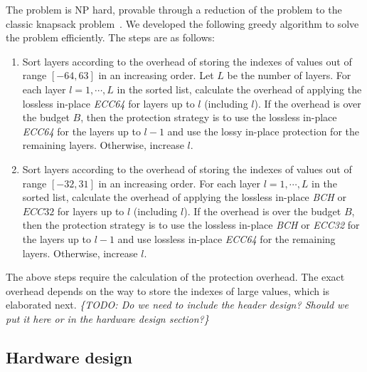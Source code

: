 \documentclass{article}
\newcommand{\TODO}[1]{{\it \color{blue}\{TODO: #1\}}}
\begin{document}
The problem is NP hard, provable through a reduction of the problem to the classic knapsack problem~\cite{hochba1997approximation}. We developed the following greedy algorithm to solve the problem efficiently. The steps are as follows:  
\begin{enumerate}
    \item Sort layers according to the overhead of storing the indexes of values out of range $[-64, 63]$ in an increasing order. Let $L$ be the number of layers. For each layer $l =1, \cdots, L$ in the sorted list, calculate the overhead of applying the lossless in-place \textit{ECC64} for layers up to $l$ (including $l$). If the overhead is over the budget $B$, then the protection strategy is to use the lossless in-place \textit{ECC64} for the layers up to $l-1$ and use the lossy in-place protection for the remaining layers. Otherwise, increase $l$. 
    \item Sort layers according to the overhead of storing the indexes of values out of range $[-32, 31]$ in an increasing order. For each layer $l =1, \cdots, L$ in the sorted list, calculate the overhead of applying the lossless in-place \textit{BCH} or $ECC32$ for layers up to $l$ (including $l$). If the overhead is over the budget $B$, then the protection strategy is to use the lossless in-place \textit{BCH} or \textit{ECC32} for the layers up to $l-1$ and use lossless in-place \textit{ECC64} for the remaining layers. Otherwise, increase $l$.
    
\end{enumerate}

The above steps require the calculation of the protection overhead. The exact overhead depends on the way to store the indexes of large values, which is elaborated next.   
\TODO{Do we need to include the header design? Should we put it here or in the hardware design section?}

\subsection{Hardware design}
\end{document}
